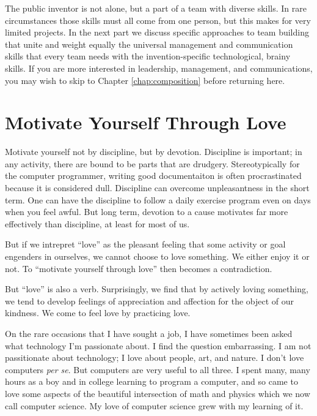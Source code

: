 \documentclass[
	fontsize=10pt, %
	twoside=false, %
	secnumdepth=1, %
]{kaobook}
\begin{document}

The public inventor is not alone, but a part of a team with diverse skills.
In rare circumstances those skills must all come from one person, but
this makes for very limited projects.
In the next part we discuss
specific approaches to team building that unite and weight
equally the universal management and communication skills that
every team needs with the invention-specific technological, brainy skills.
If you are more interested in leadership, management, and communications,
you may wish to skip to Chapter \ref{chap:composition} before returning here.

\section{Motivate Yourself Through Love}

Motivate yourself not by discipline, but by devotion.
Discipline is important; in any activity, there are bound to
be parts that are drudgery.
Stereotypically for the computer programmer, writing good
documentaiton is often procrastinated because it is considered
dull.
Discipline can overcome unpleasantness in the short term.
One can have the discipline to follow a daily exercise
program even on days when you feel awful.
But long term, devotion to a cause motivates
far more effectively than discipline, at
least for most of us.

But if we intrepret ``love'' as the pleasant feeling that
some activity or goal engenders in ourselves, we cannot
choose to love something. We either enjoy it or not.
To ``motivate yourself through love'' then becomes a contradiction.

But ``love'' is also a verb. Surprisingly, we find that
by actively loving something, we tend to develop feelings
of appreciation and affection for the object of our kindness.
We come to feel love by practicing love.

On the rare occasions that I have sought a job, I have sometimes
been asked what technology I'm passionate about.
I find the question embarrassing.
I am not passitionate about technology;
I love about people, art, and nature.
I don't love computers {\em per se}.
But computers are very useful to all three.
I spent many, many hours as a boy and in college learning to program a computer,
and so came to love some aspects of the beautiful intersection of
math and physics which we now call computer science.
My love of computer science grew with my learning of it.
\end{document}
